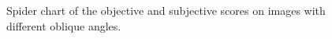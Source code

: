 \begin{figure}[H]
    \caption{Spider chart of the objective and subjective scores on images with different oblique angles.}
    \label{fig:spiderTilted}
\end{figure}

